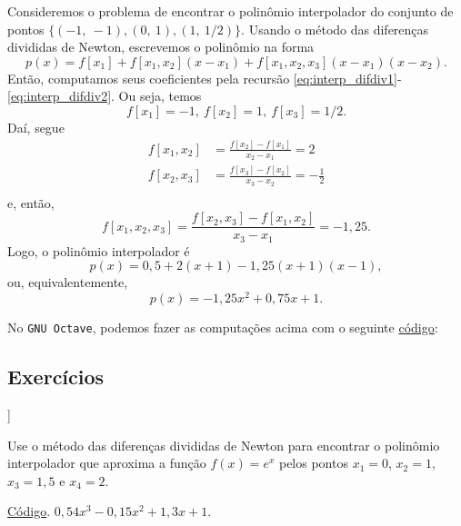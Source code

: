 \begin{ex}
  Consideremos o problema de encontrar o polinômio interpolador do conjunto de pontos $\{(-1,~-1), (0,~1), (1,~1/2)\}$. Usando o método das diferenças divididas de Newton, escrevemos o polinômio na forma
  \begin{equation}
    p(x) = f[x_1] + f[x_1,x_2](x-x_1) + f[x_1,x_2,x_3](x-x_1)(x-x_2).
  \end{equation}
  Então, computamos seus coeficientes pela recursão \eqref{eq:interp_difdiv1}-\eqref{eq:interp_difdiv2}. Ou seja, temos
  \begin{equation}
    f[x_1]=-1,~f[x_2]=1,~f[x_3]=1/2.
  \end{equation}
  Daí, segue
  \begin{align}
    f[x_1,x_2] &= \frac{f[x_2]-f[x_1]}{x_2-x_1} = 2\\
    f[x_2,x_3] &= \frac{f[x_3]-f[x_2]}{x_3-x_2} = -\frac{1}{2}\\
  \end{align}
  e, então,
  \begin{equation}
    f[x_1,x_2,x_3] = \frac{f[x_2,x_3]-f[x_1,x_2]}{x_3-x_1}=-1,25.
  \end{equation}
  Logo, o polinômio interpolador é
  \begin{equation}
    p(x) = 0,5 + 2(x+1) - 1,25(x+1)(x-1),
  \end{equation}
  ou, equivalentemente,
  \begin{equation}
    p(x) = -1,25x^2 + 0,75x + 1.
  \end{equation}

\ifisoctave
No \verb+GNU Octave+, podemos fazer as computações acima com o seguinte \href{https://github.com/phkonzen/notas/blob/master/src/MatematicaNumerica/cap_interp/dados/ex_interpoli_difdiv/ex_interpoli_difdiv.m}{código}:

\fi
\end{ex}

\subsection*{Exercícios}

\begin{flushleft}
  [[tag:revisar]]
\end{flushleft}

\begin{exer}\label{exer_interpoli_difdiv1}
  Use o método das diferenças divididas de Newton para encontrar o polinômio interpolador que aproxima a função $f(x)=e^{x}$ pelos pontos $x_1=0$, $x_2=1$, $x_3=1,5$ e $x_4=2$.
\end{exer}
\begin{resp}
\ifisoctave
\href{https://github.com/phkonzen/notas/blob/master/src/MatematicaNumerica/cap_interp/dados/exer_interpoli_dfidiv1/exer_interpoli_difdiv1.m}{Código}.
\fi
$0,54x^3 - 0,15x^2 + 1,3x + 1$.
\end{resp}


